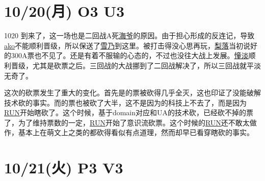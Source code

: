 \section{10/20(月) O3 U3}


1020 到来了，这一场也是二回战A死\uline{海爷}的原因。由于担心形成的反连记，导致\uline{ako}不能顺利晋级，所以保送了\uline{雪乃}到这里。被打击得没心思再玩，\uline{梨落}当初说好的300A票也不见了。还是有着不服输的心态的，不过也没往大战上发展。\uline{憧}\uline{淡}顺利晋级，尤其是砍票之后。三回战的大战挪到了二回战解决了，所以三回战就平淡无奇了。

\newpage

这次的砍票发生了重大的变化。首先是的票被砍得几乎全灭，这也印证了没能破解技术砍的事实。而的票也被砍了大半，这不是因为的科技上不去了，而是因为\uline{RUN}开始瞎砍了。这个时候，基于domain对应和UA的技术砍，已经砍不掉的票了，为了维持票数的一定，\uline{RUN}开始了意识流砍票。这个时候的\uline{RUN}还不敢太做作，基本上在萌文上之类的都砍得看似有点道理，然而却早已看穿瞎砍的事实。

\section{10/21(火) P3 V3}

